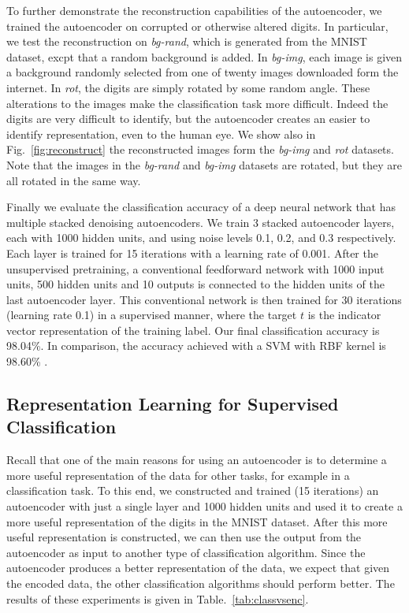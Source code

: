 To further demonstrate the reconstruction capabilities of the autoencoder, we
trained the autoencoder on corrupted or otherwise altered digits.  In
particular, we test the reconstruction on \textit{bg-rand}, which is generated
from the MNIST dataset, excpt that a random background is added. In
\textit{bg-img}, each image is given a background randomly selected from one of
twenty images downloaded form the internet. In \textit{rot}, the digits are
simply rotated by some random angle.  These alterations to the images make the
classification task more difficult. Indeed the digits are very difficult to
identify, but the autoencoder creates an easier to identify representation,
even to the human eye. We show also in Fig.~\ref{fig:reconstruct} the
reconstructed images form the \textit{bg-img} and \textit{rot} datasets. Note
that the images in the \textit{bg-rand} and \textit{bg-img} datasets are
rotated, but they are all rotated in the same way.

Finally we evaluate the classification accuracy of a deep neural network that
has multiple stacked denoising autoencoders. We train 3 stacked autoencoder
layers, each with 1000 hidden units, and using noise levels 0.1, 0.2, and 0.3
respectively. Each layer is trained for 15 iterations with a learning rate of
0.001. After the unsupervised pretraining, a conventional feedforward network
with 1000 input units, 500 hidden units and 10 outputs is connected to the
hidden units of the last autoencoder layer. This conventional network is then
trained for 30 iterations (learning rate 0.1) in a supervised manner, where the
target $t$ is the indicator vector representation of the training label. Our
final classification accuracy is 98.04\%. In comparison, the accuracy achieved
with a SVM with RBF kernel is 98.60\% \cite{vincent2010stacked}.

\subsection{Representation Learning for Supervised Classification}

Recall that one of the main reasons for using an autoencoder is to determine a
more useful representation of the data for other tasks, for example in a
classification task. To this end, we constructed and trained (15 iterations) an
autoencoder with just a single layer and 1000 hidden units and used it to
create a more useful representation of the digits in the MNIST dataset. After
this more useful representation is constructed, we can then use the output from
the autoencoder as input to another type of classification algorithm.  Since
the autoencoder produces a better representation of the data, we expect that
given the encoded data, the other classification algorithms should perform
better.  The results of these experiments is given in
Table.~\ref{tab:classvsenc}.

